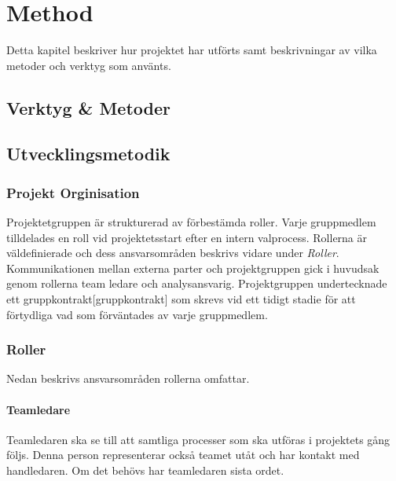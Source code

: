 
\chapter{Method}
\label{cha:method}
Detta kapitel beskriver hur projektet har utförts samt beskrivningar av vilka metoder och verktyg som använts. 

\section{Verktyg & Metoder}

\section{Utvecklingsmetodik}

\subsection{Projekt Orginisation}
Projektetgruppen är strukturerad av förbestämda roller. Varje gruppmedlem tilldelades en roll vid projektetsstart efter en intern valprocess. Rollerna är väldefinierade och dess ansvarsområden beskrivs vidare under \textit{Roller}. Kommunikationen mellan externa parter och projektgruppen gick i huvudsak genom rollerna team ledare och analysansvarig. Projektgruppen undertecknade ett gruppkontrakt[gruppkontrakt] som skrevs vid ett tidigt stadie för att förtydliga vad som förväntades av varje gruppmedlem. 

\subsection{Roller}
Nedan beskrivs ansvarsområden rollerna omfattar.

\subsubsection*{Teamledare}
Teamledaren ska se till att samtliga processer som ska utföras i projektets gång följs. Denna person representerar också teamet utåt och har kontakt med handledaren. Om det behövs har teamledaren sista ordet.

